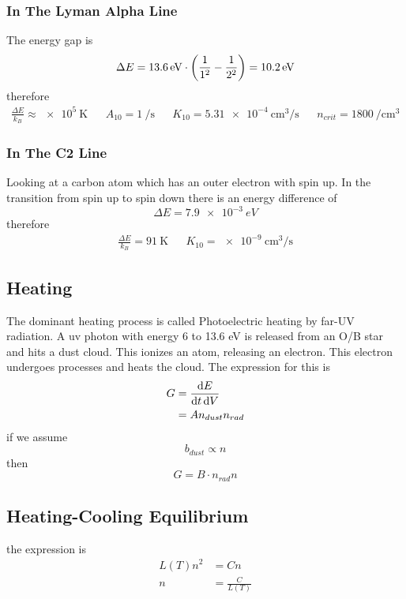 \subsubsection{In The Lyman Alpha Line}
The energy gap is
\begin{equation}
    \Delta E = \qty{13.6}{\electronvolt}\cdot\left(\frac{1}{1^2}-\frac{1}{2^2}\right) = \qty{10.2}{\electronvolt}
\end{equation}
therefore
\begin{align}
    \frac{\Delta E}{k_B} \approx \qty{e5}{\kelvin} && A_{10} = \qty{1}{\per\second} && K_{10} = \qty{5.31e-4}{\centi\meter^3\per\second} && n_{crit} = \qty{1800}{\per\centi\meter^3}
\end{align}
\subsubsection{In The C2 Line}
Looking at a carbon atom which has an outer electron with spin up. In the transition from spin up to spin down there is an energy difference of
\begin{equation}
    \Delta E = \qty{7.9e-3}{eV}
\end{equation}
therefore
\begin{align}
    \frac{\Delta E}{k_B} = \qty{91}{\kelvin} && K_{10} = \qty{e-9}{\centi\meter^3\per\second}
\end{align}
\subsection{Heating}
The dominant heating process is called Photoelectric heating by far-UV radiation. A uv photon with energy 6 to 13.6 eV is released from an O/B star and hits a dust cloud. This ionizes an atom, releasing an electron. This electron undergoes processes and heats the cloud. The expression for this is
\begin{align}
    G &= \diff{E}{t\dl V} \\
    &= A n_{dust} n_{rad}
\end{align}
if we assume 
\begin{equation}
    b_{dust} \propto n
\end{equation}
then
\begin{equation}
    G = B\cdot n_{rad} n
\end{equation}
\subsection{Heating-Cooling Equilibrium}
the expression is
\begin{align}
    L(T) n^2 &= Cn\\
    n &= \frac{C}{L(T)}
\end{align}
